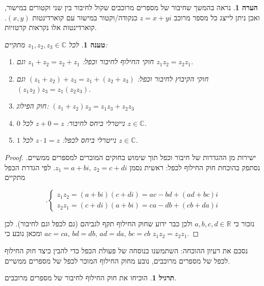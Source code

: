 \documentclass[12pt]{report}
\theoremstyle{plain}
\newtheorem{proposition}[theorem]{טענה}
\theoremstyle{definition}
\newtheorem{exercise}{תרגיל}[chapter]
\newtheorem{remark}{הערה}[chapter]
\newcommand{\R}{\mathbb{R}}
\newcommand{\C}{\mathbb{C}}
\newcommand{\0}{\mathbf{0}}
\begin{document}
\begin{remark} נראה בהמשך שחיבור של מספרים מרוכבים שקול לחיבור בין
שני וקטורים במישור, ואכן ניתן לייצג כל מספר מרוכב $z=x+yi$ כנקודה/וקטור
במישור עם קוארדינטות $(x,y)$. קוארדינטות אלו נקראות קרטזיות.
\end{remark}

\begin{proposition}
לכל $z_{1},z_{2},z_{3}\in\C$ מתקיים:
\begin{enumerate}[label=\alph*.]

\item חוקי החילוף לחיבור וכפל: $z_{1}+z_{2}=z_{2}+z_{1}$ וגם $z_{1}z_{2}=z_{2}z_{1}$.

\item חוקי הקיבוץ לחיבור וכפל: $(z_{1}+z_{2})+z_{3}=z_{1}+(z_{2}+z_{3})$
וגם $(z_{1}z_{2})z_{3}=z_{1}(z_{2}z_{3})$.

\item חוק הפילוג: $(z_{1}+z_{2})z_{3}=z_{1}z_{3}+z_{2}z_{3}$

\item $0$ נייטרלי ביחס לחיבור: $z+0=z$ לכל $z\in\C$.

\item $1$ נייטרלי ביחס לכפל: $z\cdot1=z$ לכל $z\in\C$.
\end{enumerate}
\end{proposition}

\begin{proof} ישירות מן ההגדרות של חיבור וכפל תוך שימוש בחוקים המוכרים
למספרים ממשיים. נסתפק בהוכחת חוק החילוף לכפל: ראשית נסמן $z_{1}=a+bi,\,z_{2}=c+di$.
לפי הגדרת הכפל מתקיים

$$
.\begin{cases}
z_{1}z_{2}=(a+bi)(c+di)=ac-bd+(ad+bc)i\\
z_{2}z_{1}=(c+di)(a+bi)=ca-db+(cb+da)i
\end{cases}
$$

נזכור כי $a,b,c,d\in\R$ ולכן כבר ידוע שחוק החילוף תקף
לגביהם (גם לכפל וגם לחיבור). לכן $ac=ca,\,bd=db,\,ad=da,\,bc=cb$
ומכאן נובע כי $z_{1}z_{2}=z_{2}z_{1}$.
\end{proof}

נסכם את רעיון ההוכחה: השתמשנו בנוסחה של פעולת הכפל כדי להבין כיצד
חוק החילוף לכפל של מספרים מרוכבים, נובע מחוק החילוף המוכר לכפל של
מספרים ממשיים.

\begin{exercise}
הוכיחו את חוק החילוף לחיבור של מספרים מרוכבים.
\end{exercise}
\end{document}
